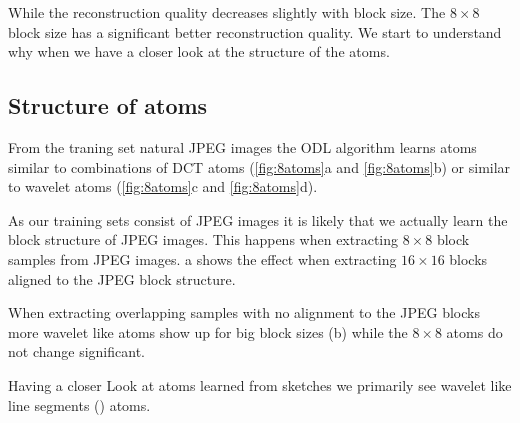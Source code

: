 While the reconstruction quality decreases slightly with block size. 
The $8\times8$ block size has a significant better reconstruction quality. 
We start to understand why when we have a closer look at the structure of
the atoms. 

\newpage
\subsection{Structure of atoms}
From the traning set natural JPEG images the ODL algorithm learns atoms similar
to combinations of DCT atoms (\ref{fig:8atoms}a and  \ref{fig:8atoms}b) or
similar to wavelet atoms (\ref{fig:8atoms}c and \ref{fig:8atoms}d).

As our training sets consist of JPEG images it is likely that we actually learn
the block structure of JPEG images. This happens when extracting
$8\times 8$ block samples from JPEG images. a shows
the effect when extracting $16\times 16$ blocks aligned to the JPEG block
structure.

When extracting overlapping samples with no alignment to the JPEG
blocks more wavelet like atoms show up for big block sizes
(b) while the $8\times 8$ atoms do not change
significant. 

Having a closer Look at atoms learned from sketches we primarily see wavelet
like line segments () atoms.


